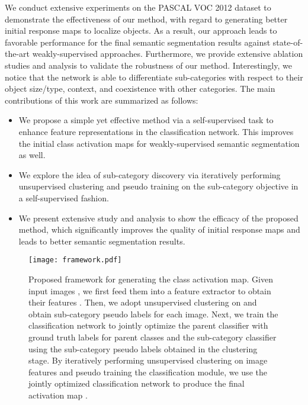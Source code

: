 \documentclass[10pt,twocolumn,letterpaper]{article}
\begin{document}
We conduct extensive experiments on the PASCAL VOC 2012 dataset \cite{PASCAL_VOC_2010_Data} to demonstrate the effectiveness of our method, with regard to generating better initial response maps to localize objects.
As a result, our approach leads to favorable performance for the final semantic segmentation results against state-of-the-art weakly-supervised approaches.
Furthermore, we provide extensive ablation studies and analysis to validate the robustness of our method.
Interestingly, we notice that the network is able to differentiate sub-categories with respect to their object size/type, context, and coexistence with other categories.
The main contributions of this work are summarized as follows:
\begin{itemize}
    \item We propose a simple yet effective method via a self-supervised task to enhance feature representations in the classification network. This  improves the initial class activation maps for weakly-supervised semantic segmentation as well.
    
    \item We explore the idea of sub-category discovery via iteratively performing unsupervised clustering and pseudo training on the sub-category objective in a self-supervised fashion.
    
    \item We present extensive study and analysis to show the efficacy of the proposed method, which significantly improves the quality of initial response maps and leads to better semantic segmentation results.
    
    
\end{itemize}













\begin{figure*}[t]
	\centering
	\texttt{[image: framework.pdf]}\\
\caption{
		Proposed framework for generating the class activation map. 
Given input images , we first feed them into a feature extractor  to obtain their features .
Then, we adopt unsupervised clustering on  and obtain sub-category pseudo labels  for each image.
Next, we train the classification network to jointly optimize the parent classifier  with ground truth labels  for parent classes and the sub-category classifier  using the sub-category pseudo labels obtained in the clustering stage.
By iteratively performing unsupervised clustering on image features and pseudo training the classification module, we use the jointly optimized classification network to produce the final activation map .
	}
	\label{fig: framework}
	\vspace{-3mm}
\end{figure*}
\end{document}
